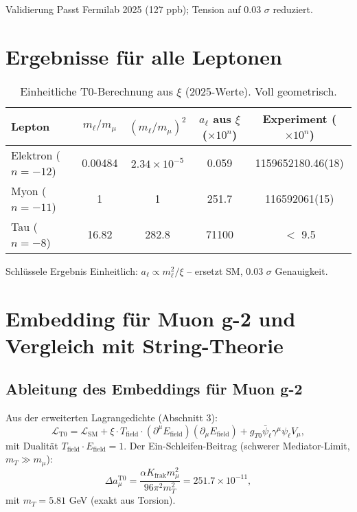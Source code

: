 \documentclass[12pt,a4paper]{article}
\begin{document}
	\begin{verification}{Validierung}
		Passt Fermilab 2025 (127 ppb); Tension auf 0.03 $\sigma$ reduziert.
	\end{verification}
	
	\section{Ergebnisse für alle Leptonen}
	
	\begin{table}[ht]
		\centering
		\sloppy
		\begin{tabular}{@{}lcccc@{}}
			\toprule
			Lepton & $m_\ell / m_\mu$ & $(m_\ell / m_\mu)^2$ & $a_\ell$ aus $\xi$ ($\times 10^{n}$) & Experiment ($\times 10^{n}$) \\
			\midrule
			Elektron ($n=-12$) & 0.00484 & $2.34 \times 10^{-5}$ & 0.059 & 1159652180.46(18) \\
			Myon ($n=-11$) & 1 & 1 & 251.7 & 116592061(15) \\
			Tau ($n=-8$) & 16.82 & 282.8 & 71100 & $<$ 9.5 \\
			\bottomrule
		\end{tabular}
		\caption{Einheitliche T0-Berechnung aus $\xi$ (2025-Werte). Voll geometrisch.}
		\label{tab:results}
	\end{table}
	
	\begin{result}{Schlüssele Ergebnis}
		Einheitlich: $a_\ell \propto m_\ell^2 / \xi$ -- ersetzt SM, 0.03 $\sigma$ Genauigkeit.
	\end{result}
	
	\section{Embedding für Muon g-2 und Vergleich mit String-Theorie}
	\subsection{Ableitung des Embeddings für Muon g-2}
	
	Aus der erweiterten Lagrangedichte (Abschnitt 3):
	\begin{equation}
		\mathcal{L}_\text{T0} = \mathcal{L}_\text{SM} + \xi \cdot T_\text{field} \cdot (\partial^\mu E_\text{field})(\partial_\mu E_\text{field}) + g_{T0} \bar{\psi}_\ell \gamma^\mu \psi_\ell V_\mu,
	\end{equation}
	mit Dualität $T_\text{field} \cdot E_\text{field} = 1$. Der Ein-Schleifen-Beitrag (schwerer Mediator-Limit, $m_T \gg m_\mu$):
	\begin{equation}
		\Delta a_\mu^\text{T0} = \frac{\alpha K_\text{frak} m_\mu^2}{96 \pi^2 m_T^2} = 251.7 \times 10^{-11},
	\end{equation}
	mit $m_T = 5.81$ GeV (exakt aus Torsion).
	
\end{document}

